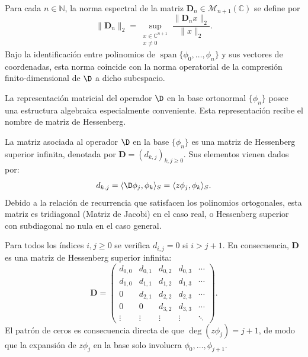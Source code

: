 \begin{defn}\label{def:norma_espectral_truncada}
	Para cada $n \in \mathbb{N}$, la norma espectral de la matriz $\mathbf{D}_n \in \mathcal{M}_{n+1}(\mathbb{C})$ se define por
	\[
		\|\mathbf{D}_n\|_2 = \sup_{\substack{x \in \mathbb{C}^{n+1} \\ x \neq 0}} \frac{\|\mathbf{D}_n x\|_2}{\|x\|_2}.
	\]
	Bajo la identificación entre polinomios de $\operatorname{span}\{\phi_0,\dots,\phi_n\}$ y sus vectores de coordenadas, esta norma coincide con la norma operatorial de la compresión finito-dimensional de $\D$ a dicho subespacio.
\end{defn}

La representación matricial del operador $\D$ en la base ortonormal $\{\phi_n\}$ posee una estructura algebraica especialmente conveniente. Esta representación recibe el nombre de matriz de Hessenberg.

\begin{defn} \label{def:hessenberg}
	La matriz asociada al operador $\D$ en la base $\{\phi_n\}$ es una matriz de Hessenberg superior infinita, denotada por $\mathbf{D} = (d_{k,j})_{k,j\ge 0}$. Sus elementos vienen dados por:
	\begin{equation}
		d_{k,j} = \langle \D\phi_j, \phi_k \rangle_S = \langle z \phi_j, \phi_k \rangle_S.
	\end{equation}
	Debido a la relación de recurrencia que satisfacen los polinomios ortogonales, esta matriz es tridiagonal (Matriz de Jacobi) en el caso real, o Hessenberg superior con subdiagonal no nula en el caso general.
\end{defn}

\begin{prop}\label{prop:hessenberg}
	Para todos los índices $i, j \geq 0$ se verifica $d_{i,j} = 0$ si $i > j+1$. En consecuencia, $\mathbf{D}$ es una matriz de Hessenberg superior infinita:
	\[
		\mathbf{D} = \begin{pmatrix}
			d_{0,0} & d_{0,1} & d_{0,2} & d_{0,3} & \cdots \\
			d_{1,0} & d_{1,1} & d_{1,2} & d_{1,3} & \cdots \\
			0       & d_{2,1} & d_{2,2} & d_{2,3} & \cdots \\
			0       & 0       & d_{3,2} & d_{3,3} & \cdots \\
			\vdots  & \vdots  & \vdots  & \vdots  & \ddots
		\end{pmatrix}.
	\]
	El patrón de ceros es consecuencia directa de que $\deg(z\phi_j) = j+1$, de modo que la expansión de $z\phi_j$ en la base solo involucra $\phi_0, \dots, \phi_{j+1}$.
\end{prop}

